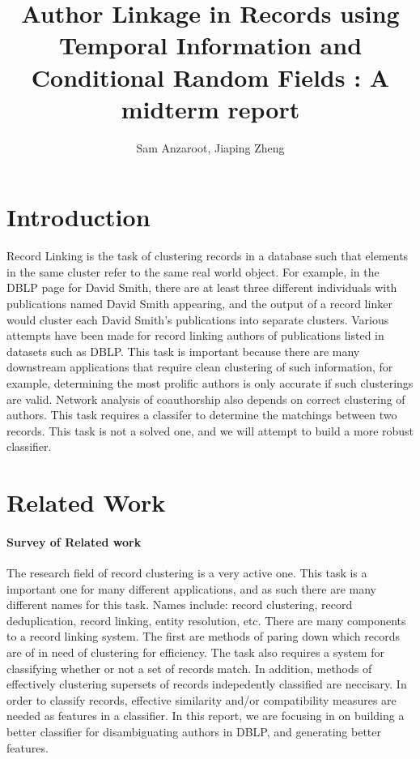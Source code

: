 \documentclass[twocolumn,letterpaper]{article}
\title{Author Linkage in Records using Temporal Information and Conditional Random Fields : A midterm report}
\author{Sam Anzaroot, Jiaping Zheng}
\date{}
\begin{document}
\ifpdf
{}
\else
{}
\fi

\maketitle

\section{Introduction} %
\label{sec:introduction}
Record Linking is the task of clustering records in a database such that elements in the same cluster refer to the same real world object. For example, in the DBLP page for David Smith, there are at least three different individuals with publications named David Smith appearing, and the output of a record linker would cluster each David Smith's publications into separate clusters. Various attempts have been made for record linking authors of publications listed in datasets such as DBLP. This task is important because there are many downstream applications that require clean clustering of such information, for example, determining the most prolific authors is only accurate if such clusterings are valid. Network analysis of coauthorship also depends on correct clustering of authors. This task requires a classifer to determine the matchings between two records. This task is not a solved one, and we will attempt to build a more robust classifier.

\section{Related Work} %
\label{sec:related_work}
\paragraph{Survey of Related work} %
\label{par:survey_of_related_work}
The research field of record clustering is a very active one. This task is a important one for many different applications, and as such there are many different names for this task. Names include: record clustering, record deduplication, record linking, entity resolution, etc. There are many components to a record linking system. The first are methods of paring down which records are of in need of clustering for efficiency. The task also requires a system for classifying whether or not a set of records match. In addition, methods of effectively clustering supersets of records indepedently classified are neccisary. In order to classify records, effective similarity and/or compatibility measures are needed as features in a classifier. In this report, we are focusing in on building a better classifier for disambiguating authors in DBLP, and generating better features. 
\end{document}
